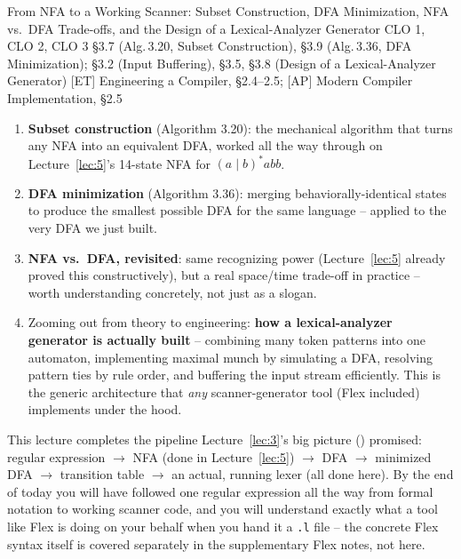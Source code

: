 \documentclass[full-course-notes.tex]{subfiles}
\begin{document}
  {From NFA to a Working Scanner: Subset Construction, DFA Minimization, NFA vs.\ DFA
   Trade-offs, and the Design of a Lexical-Analyzer Generator}
  {CLO 1, CLO 2, CLO 3}
  {\S3.7 (Alg.\,3.20, Subset Construction), \S3.9 (Alg.\,3.36, DFA Minimization); \S3.2
   (Input Buffering), \S3.5, \S3.8 (Design of a Lexical-Analyzer Generator)}
  {[ET] Engineering a Compiler, \S2.4--2.5; [AP] Modern Compiler Implementation, \S2.5}
\setcounter{section}{0}
\makelecturetitle


\begin{coreidea}
\begin{enumerate}
  \item \textbf{Subset construction} (Algorithm 3.20): the mechanical algorithm that turns any
  NFA into an equivalent DFA, worked all the way through on Lecture~\ref{lec:5}'s 14-state NFA
  for $(a\mid b)^{*}abb$.
  \item \textbf{DFA minimization} (Algorithm 3.36): merging behaviorally-identical states to
  produce the smallest possible DFA for the same language -- applied to the very DFA we just
  built.
  \item \textbf{NFA vs.\ DFA, revisited}: same recognizing power (Lecture~\ref{lec:5} already
  proved this constructively), but a real space/time trade-off in practice -- worth
  understanding concretely, not just as a slogan.
  \item Zooming out from theory to engineering: \textbf{how a lexical-analyzer generator is
  actually built} -- combining many token patterns into one automaton, implementing maximal
  munch by simulating a DFA, resolving pattern ties by rule order, and buffering the input
  stream efficiently. This is the generic architecture that \emph{any} scanner-generator tool
  (Flex included) implements under the hood.
\end{enumerate}
This lecture completes the pipeline Lecture~\ref{lec:3}'s big picture
() promised: regular expression $\to$ NFA (done in
Lecture~\ref{lec:5}) $\to$ DFA $\to$ minimized DFA $\to$ transition table $\to$ an actual,
running lexer (all done here). By the end of today you will have followed one regular
expression all the way from formal notation to working scanner code, and you will understand
exactly what a tool like Flex is doing on your behalf when you hand it a \texttt{.l} file --
the concrete Flex syntax itself is covered separately in the supplementary Flex notes, not
here.
\end{coreidea}
\end{document}
